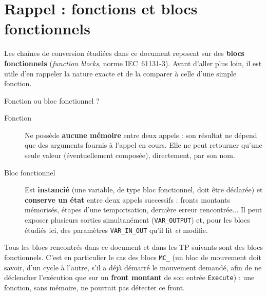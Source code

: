 \section{Rappel : fonctions et blocs fonctionnels}
\label{secRappelBlocsFonctionnels}

Les chaînes de conversion étudiées dans ce document reposent sur des
\textbf{blocs fonctionnels} (\emph{function blocks}, norme IEC~61131-3).
Avant d'aller plus loin, il est utile d'en rappeler la nature exacte et de
la comparer à celle d'une simple fonction.

\begin{UPSTIinfor}{Fonction ou bloc fonctionnel ?}
\begin{description}
    \item[Fonction] Ne possède \textbf{aucune mémoire} entre deux appels :
    son résultat ne dépend que des arguments fournis à l'appel en cours.
    Elle ne peut retourner qu'une seule valeur (éventuellement composée),
    directement, par son nom.
    \item[Bloc fonctionnel] Est \textbf{instancié} (une variable, de type
    bloc fonctionnel, doit être déclarée) et \textbf{conserve un état}
    entre deux appels successifs : fronts montants mémorisés, étapes d'une
    temporisation, dernière erreur rencontrée... Il peut exposer plusieurs
    sorties simultanément (\texttt{VAR\_OUTPUT}) et, pour les blocs étudiés
    ici, des paramètres \texttt{VAR\_IN\_OUT} qu'il lit \emph{et} modifie.
\end{description}
\end{UPSTIinfor}

Tous les blocs rencontrés dans ce document et dans les TP suivants sont
des blocs fonctionnels. C'est en particulier le cas des blocs \texttt{MC\_}
(un bloc de mouvement doit savoir, d'un cycle à l'autre, s'il a déjà
démarré le mouvement demandé, afin de ne déclencher l'exécution que sur un
\textbf{front montant} de son entrée \texttt{Execute}) : une fonction,
sans mémoire, ne pourrait pas détecter ce front.

